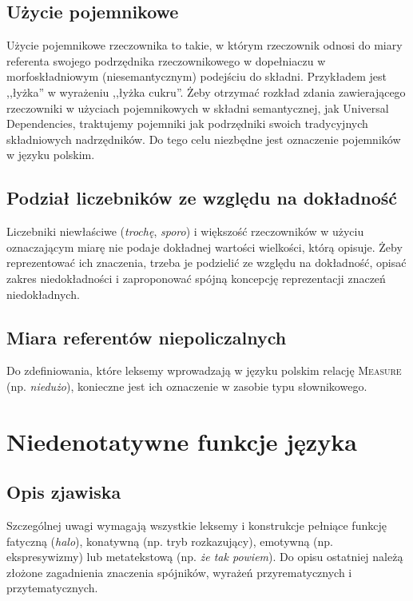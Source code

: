 \documentclass[a4paper, 12pt]{article}
\theoremstyle{remark}
\begin{document}
\subsection{Użycie pojemnikowe} %
\label{pojemniki}
Użycie pojemnikowe rzeczownika to takie, w którym rzeczownik odnosi do miary referenta swojego podrzędnika rzeczownikowego w dopełniaczu w morfoskładniowym (niesemantycznym) podejściu do składni. Przykładem jest ,,łyżka'' w wyrażeniu ,,łyżka cukru''.
Żeby otrzymać rozkład zdania zawierającego rzeczowniki w użyciach pojemnikowych w składni semantycznej, jak Universal Dependencies, traktujemy pojemniki jak podrzędniki swoich tradycyjnych składniowych nadrzędników. Do tego celu niezbędne jest oznaczenie pojemników w języku polskim.


\subsection{Podział liczebników ze względu na dokładność} %

Liczebniki niewłaściwe (\emph{trochę}, \emph{sporo}) i większość rzeczowników w użyciu oznaczającym miarę nie podaje dokładnej wartości wielkości, którą opisuje. Żeby reprezentować ich znaczenia, trzeba je podzielić ze względu na dokładność, opisać zakres niedokładności i zaproponować spójną koncepcję reprezentacji znaczeń niedokładnych.


\subsection{Miara referentów niepoliczalnych} %

Do zdefiniowania, które leksemy wprowadzają w języku polskim relację \textsc{Measure} (np. \emph{niedużo}), konieczne jest ich oznaczenie w zasobie typu słownikowego.



\section{Niedenotatywne funkcje języka} %
{
\renewcommand\thesection{}
\renewcommand\thesubsection{}
\setcounter{subsection}{-1}
\subsection{Opis zjawiska} %
\label{sub:opis_zjawiska2}
}
Szczególnej uwagi wymagają wszystkie leksemy i konstrukcje pełniące funkcję fatyczną (\emph{halo}), konatywną (np. tryb rozkazujący), emotywną (np. ekspresywizmy) lub metatekstową (np. \emph{że tak powiem}).
Do opisu ostatniej należą złożone zagadnienia znaczenia spójników, wyrażeń przyrematycznych i przytematycznych.
\end{document}
